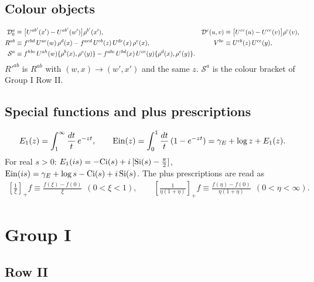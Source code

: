 \documentclass[10pt]{article}
\numberwithin{equation}{section}
\begin{document}
\subsection{Colour objects}
\begin{align}
\mathcal{D}_{0}^{a}&\equiv\big[U^{ab'}(x')-U^{ab'}(w')\big]\rho^{b'}(x'), &
\mathcal{D}^{c}(u,v)&\equiv\big[U^{ce}(u)-U^{ce}(v)\big]\rho^{e}(v),\notag\\
R^{ab}&\equiv f^{cbd}\,U^{ac}(w)\,\rho^{d}(x)-f^{acd}\,U^{cb}(z)\,U^{de}(x)\,\rho^{e}(x), &
V^{be}&\equiv U^{cb}(z)\,U^{ce}(y),\notag\\
\mathcal{S}^{a}&\equiv f^{hbc}\,U^{ah}(w)\{\rho^{b}(x),\rho^{c}(y)\}-f^{abc}\,U^{bd}(x)\,U^{ce}(y)\{\rho^{d}(x),\rho^{e}(y)\}. \label{eq:colour}
\end{align}
$R'^{ab}$ is $R^{ab}$ with $(w,x)\to(w',x')$ and the same $z$. $\mathcal{S}^{a}$ is the colour bracket of Group I Row II.

\subsection{Special functions and plus prescriptions}
\begin{align}
E_{1}(z)=\int_{1}^{\infty}\frac{dt}{t}\,e^{-zt},\qquad {\rm Ein}(z)=\int_{0}^{1}\frac{dt}{t}\,(1-e^{-zt})=\gamma_{E}+\log z+E_{1}(z).
\end{align}
For real $s>0$: $E_{1}(is)=-{\rm Ci}(s)+i\,[{\rm Si}(s)-\tfrac{\pi}{2}]$, ${\rm Ein}(is)=\gamma_{E}+\log s-{\rm Ci}(s)+i\,{\rm Si}(s)$. The plus prescriptions are read as
\begin{align}
\left[\frac{1}{\xi}\right]_{+}f\equiv\frac{f(\xi)-f(0)}{\xi}\ \ (0<\xi<1),\qquad
\left[\frac{1}{\eta(1+\eta)}\right]_{+}f\equiv\frac{f(\eta)-f(0)}{\eta(1+\eta)}\ \ (0<\eta<\infty). \label{eq:plus}
\end{align}

\section{Group I}

\subsection{Row II}\label{sec:RowII}
\end{document}
